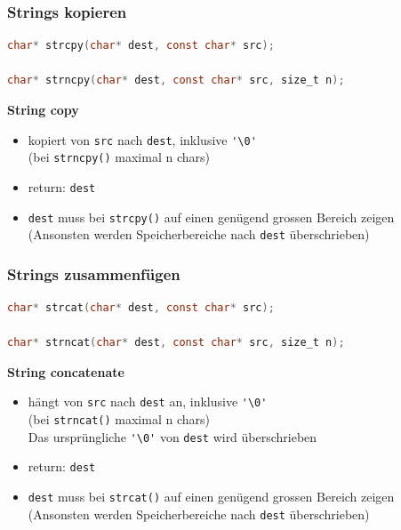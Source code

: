 		\subsubsection{Strings kopieren}
			\begin{lstlisting}[language=C]
char* strcpy(char* dest, const char* src);

char* strncpy(char* dest, const char* src, size_t n);
			\end{lstlisting}
			\textbf{String copy}
				\begin{itemize}
					\item kopiert von \verb|src| nach \verb|dest|, inklusive \verb|'\0'| \\ (bei \verb|strncpy()| maximal n chars)
					\item return: \verb|dest|
					\item \verb|dest| muss bei \verb|strcpy()| auf einen genügend grossen Bereich zeigen\\ (Ansonsten werden Speicherbereiche nach \verb|dest| überschrieben)
				\end{itemize}

		\subsubsection{Strings zusammenfügen}
			\begin{lstlisting}[language=C]
char* strcat(char* dest, const char* src);

char* strncat(char* dest, const char* src, size_t n);
			\end{lstlisting}
			\textbf{String concatenate}
				\begin{itemize}
					\item hängt von \verb|src| nach \verb|dest| an, inklusive \verb|'\0'| \\
					(bei \verb|strncat()| maximal n chars) \\
					Das ursprüngliche \verb|'\0'| von \verb|dest| wird überschrieben 
					\item return: \verb|dest|
					\item \verb|dest| muss bei \verb|strcat()| auf einen genügend grossen Bereich zeigen\\ (Ansonsten werden Speicherbereiche nach \verb|dest| überschrieben)
				\end{itemize}

